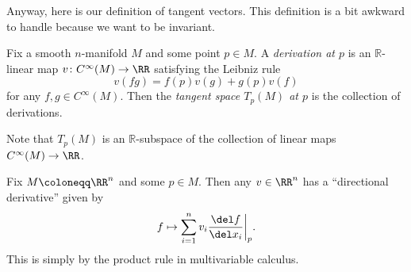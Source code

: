 \documentclass[../notes.tex]{subfiles}
\begin{document}
Anyway, here is our definition of tangent vectors. This definition is a bit awkward to handle because we want to be invariant.
\begin{definition}
	Fix a smooth $n$-manifold $M$ and some point $p\in M$. A \textit{derivation at $p$} is an $\mathbb R$-linear map $v\colon C^\infty(M)\to\RR$ satisfying the Leibniz rule
	\[v(fg)=f(p)v(g)+g(p)v(f)\]
	for any $f,g\in C^\infty(M)$. Then the \textit{tangent space $T_p(M)$ at $p$} is the collection of derivations.
\end{definition}
\begin{remark}
	Note that $T_p(M)$ is an $\mathbb R$-subspace of the collection of linear maps $C^\infty(M)\to\RR$.
\end{remark}
\begin{example}
	Fix $M\coloneqq\RR^n$ and some $p\in M$. Then any $v\in\RR^n$ has a ``directional derivative'' given by
	\[f\mapsto\sum_{i=1}^nv_i\frac{\del f}{\del x_i}\bigg|_p.\]
	This is simply by the product rule in multivariable calculus.
\end{example}
\end{document}
